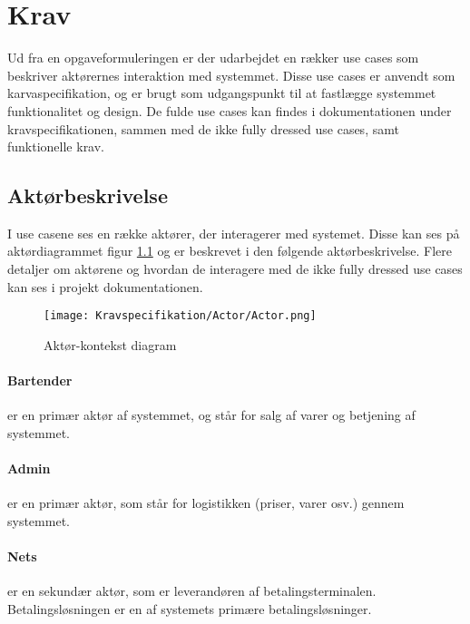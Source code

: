 \chapter{Krav}
Ud fra en opgaveformuleringen er der udarbejdet en rækker use cases som beskriver aktørernes interaktion med systemmet. Disse use cases er anvendt som karvaspecifikation, og er brugt som udgangspunkt til at fastlægge systemmet funktionalitet og design. De fulde use cases kan findes i dokumentationen under kravspecifikationen, sammen med de ikke fully dressed use cases, samt funktionelle krav. \newline


\begin{minipage}{0.45\textwidth}
\raggedright
\section{Aktørbeskrivelse}
I use casene ses en række aktører, der interagerer med systemet. Disse kan ses på aktørdiagrammet figur \ref{fig:actordiagram} og er beskrevet i den følgende aktørbeskrivelse. Flere detaljer om aktørene og hvordan de interagere med de ikke fully dressed use cases kan ses i projekt dokumentationen. 
\newline
\newline
\end{minipage}
\begin{minipage}{0.55\textwidth}
\begin{figure}[H]
	\centering
	\texttt{[image: Kravspecifikation/Actor/Actor.png]}
	\caption{Aktør-kontekst diagram}
	\label{fig:actordiagram}
\end{figure}
\end{minipage} \hfill
\newline
\subsubsection*{Bartender}
er en primær aktør af systemmet, og står for salg af varer og betjening af systemmet. 

\subsubsection*{Admin}
er en primær aktør, som står for logistikken (priser, varer osv.) gennem systemmet. 

\subsubsection*{Nets}
er en sekundær aktør, som er leverandøren af betalingsterminalen. Betalingsløsningen er en af systemets primære betalingsløsninger.


